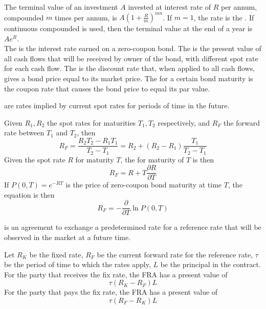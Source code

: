 \documentclass[a4paper,oneside,openany]{book}
\begin{document}
The terminal value of an investment $A$ invested at interest rate of $R$ per annum, compounded $m$ times per annum, is $A(1+\frac{R}{m})^{mn}$. If $m=1$, the rate is the . If continuous compounded is used, then  the terminal value at the end of a year is $Ae^{R}$.\\

The  is the interest rate earned on a zero-coupon bond. The  is the present value of all cash flows that will be received by owner of the bond, with different spot rate for each cash flow. The  is the discount rate that, when applied to all cash flows, gives a bond price equal to its market price. The  for a certain bond maturity is the coupon rate that causes the bond price to equal its par value.\\

\begin{definition}
 are rates implied by current spot rates for periods of time in the future.
\end{definition}

Given $R_1, R_2$ the spot rates for maturities $T_1, T_2$ respectively, and $R_F$ the forward rate between $T_1$ and $T_2$, then
\begin{equation*}
R_F = \frac{R_2 T_2 - R_1 T_1}{T_2 - T_1}=R_2 + (R_2 - R_1)\frac{T_1}{T_2 - T_1} \nonumber
\end{equation*}
Given the spot rate $R$ for maturity $T$, the  for maturity of $T$ is then
\begin{equation*}
R_F = R + T \frac{\partial R}{\partial T} \nonumber
\end{equation*}
If $P(0,T) = e^{-RT}$ is the price of zero-coupon bond maturity at time $T$, the equation is then
\begin{equation*}
R_F = -\frac{\partial}{\partial T} \ln P(0,T) \nonumber
\end{equation*}

\begin{definition}
 is an agreement to exchange a predetermined rate for a reference rate that will be observed in the market at a future time.
\end{definition}

Let $R_K$ be the fixed rate, $R_F$ be the current forward rate for the reference rate, $\tau$ be the period of time to which the rates apply, $L$ be the principal in the contract.\\
For the party that receives the fix rate, the FRA has a present value of 
\begin{equation*}
\tau (R_K - R_F)L \nonumber
\end{equation*}
For the party that pays the fix rate, the FRA has a present value of
\begin{equation*}
\tau (R_F - R_K)L \nonumber
\end{equation*}
\end{document}

